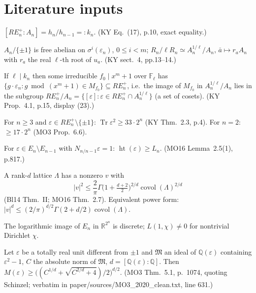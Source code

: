\chapter{Literature inputs}
\begin{lemma}[KY index {[L]}]\label{lem:ky17}
$[RE^+_n:A_n]=h_n/h_{n-1}=:k_n$. (KY Eq.~(17), p.10, exact equality.)
\end{lemma}
\begin{lemma}\label{lem:kyfree}
$A_n/\{\pm1\}$ is free abelian on $\sigma^i(\varepsilon_n)$, $0\le i<m$; $R_n/\ell R_n\simeq A_n^{1/\ell}/A_n$, $\bar a\mapsto r_aA_n$ with $r_a$ the real $\ell$-th root of $u_a$. (KY sect.~4, pp.13--14.)
\end{lemma}
\begin{lemma}[KY saturation {[L]}]\label{lem:ky41}
If $\ell\mid k_n$ then some irreducible $f_0\mid x^m+1$ over $\mathbb{F}_\ell$ has $\{g\cdot\varepsilon_n: g\bmod(x^m+1)\in M_{f_0}\}\subseteq RE^+_n$, i.e.\ the image of $M_{f_0}$ in $A_n^{1/\ell}/A_n$ lies in the subgroup $RE^+_n/A_n=\{[\varepsilon]:\varepsilon\in RE^+_n\cap A_n^{1/\ell}\}$ (a set of cosets). (KY Prop.~4.1, p.15, display (23).)
\end{lemma}
\begin{lemma}\label{lem:ky23}
For $n\ge3$ and $\varepsilon\in RE^+_n\setminus\{\pm1\}$: $\operatorname{Tr}\varepsilon^2\ge33\cdot2^n$ (KY Thm.~2.3, p.4). For $n=2$: $\ge17\cdot2^n$ (MO3 Prop.~6.6).
\end{lemma}
\begin{lemma}\label{lem:mo25-z2}
For $\varepsilon\in E_n\setminus E_{n-1}$ with $N_{n/n-1}\varepsilon=1$: $\operatorname{ht}(\varepsilon)\ge L_n$. (MO16 Lemma~2.5(1), p.817.)
\end{lemma}
\begin{lemma}[Blichfeldt {[L]}]\label{lem:blich}
A rank-$d$ lattice $\Lambda$ has a nonzero $v$ with
\[ |v|^2\le\frac{2}{\pi}\Gamma\big(1+\tfrac{d+2}{2}\big)^{2/d}\operatorname{covol}(\Lambda)^{2/d} \]
(Bl14 Thm.~II; MO16 Thm.~2.7). Equivalent power form: $|v|^d\le(2/\pi)^{d/2}\Gamma(2+d/2)\operatorname{covol}(\Lambda)$.
\end{lemma}
\begin{lemma}[Dirichlet {[L]}]\label{lem:dirichlet}
The logarithmic image of $E_n$ in $\mathbb{R}^{2^n}$ is discrete; $L(1,\chi)\ne0$ for nontrivial Dirichlet $\chi$.
\end{lemma}
\begin{lemma}\label{lem:schinzel}
Let $\varepsilon$ be a totally real unit different from $\pm1$ and $\mathfrak M$ an ideal of $\mathbb Q(\varepsilon)$ containing $\varepsilon^2-1$, $C$ the absolute norm of $\mathfrak M$, $d=[\mathbb Q(\varepsilon):\mathbb Q]$. Then $M(\varepsilon)\ge\big((C^{1/d}+\sqrt{C^{2/d}+4})/2\big)^{d/2}$. (MO3 Thm.~5.1, p.~1074, quoting Schinzel; verbatim in paper/sources/MO3\_2020\_clean.txt, line 631.)
\end{lemma}
